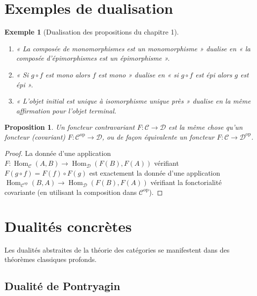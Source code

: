 \documentclass[a4paper,12pt]{book}
\DeclareMathOperator{\Hom}{Hom}
\newcommand{\op}{\mathrm{op}}
\newtheorem{proposition}[theoreme]{Proposition}
\newtheorem{exemple}[theoreme]{Exemple}
\begin{document}
\section{Exemples de dualisation}

\begin{exemple}[Dualisation des propositions du chapitre 1]\label{ex:dual-chap1}
\begin{enumerate}[label=(\alph*)]
  \item « La composée de monomorphismes est un monomorphisme » dualise en « la composée d'épimorphismes est un épimorphisme ».
  \item « Si $g \circ f$ est mono alors $f$ est mono » dualise en « si $g \circ f$ est épi alors $g$ est épi ».
  \item « L'objet initial est unique à isomorphisme unique près » dualise en la même affirmation pour l'objet terminal.
\end{enumerate}
\end{exemple}

\begin{proposition}\label{prop:contra-cop}
Un foncteur contravariant $F : \mathcal{C} \to \mathcal{D}$ est la même chose qu'un foncteur (covariant) $F : \mathcal{C}^{\op} \to \mathcal{D}$, ou de façon équivalente un foncteur $F : \mathcal{C} \to \mathcal{D}^{\op}$.
\end{proposition}

\begin{proof}
La donnée d'une application $F : \Hom_\mathcal{C}(A,B) \to \Hom_\mathcal{D}(F(B), F(A))$ vérifiant $F(g \circ f) = F(f) \circ F(g)$ est exactement la donnée d'une application $\Hom_{\mathcal{C}^{\op}}(B,A) \to \Hom_\mathcal{D}(F(B), F(A))$ vérifiant la fonctorialité covariante (en utilisant la composition dans $\mathcal{C}^{\op}$).
\end{proof}

\section{Dualités concrètes}

Les dualités abstraites de la théorie des catégories se manifestent dans des théorèmes classiques profonds.

\subsection{Dualité de Pontryagin}
\end{document}
